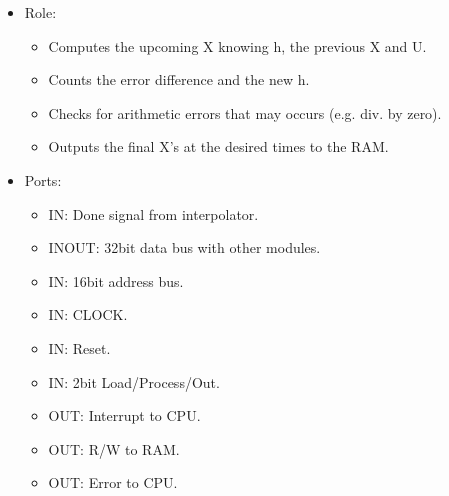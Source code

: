 \documentclass[12pt]{report}
\begin{document}
\begin{itemize}
    \item Role:
    \begin{itemize}
        \item Computes the upcoming X knowing h, the previous X and U.
        \item Counts the error difference and the new h.
        \item Checks for arithmetic errors that may occurs (e.g. div. by zero).
        \item Outputs the final X's at the desired times to the RAM.
    \end{itemize}
    \item Ports:
    \begin{itemize}
        \item IN: Done signal from interpolator.
        \item INOUT: 32bit data bus with other modules.
        \item IN: 16bit address bus.
        \item IN: CLOCK.
        \item IN: Reset.
        \item IN: 2bit Load/Process/Out.
        \item OUT: Interrupt to CPU.
        \item OUT: R/W to RAM.
        \item OUT: Error to CPU.
    \end{itemize}
\end{itemize}
\end{document}
